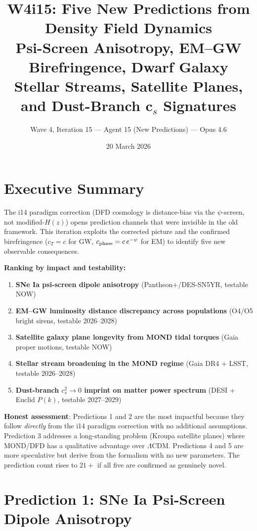 \documentclass[11pt]{article}
\title{W4i15: Five New Predictions from Density Field Dynamics\\
\large Psi-Screen Anisotropy, EM--GW Birefringence, Dwarf Galaxy\\
Stellar Streams, Satellite Planes, and Dust-Branch c$_s$ Signatures}
\author{Wave 4, Iteration 15 --- Agent 15 (New Predictions) --- Opus 4.6}
\date{20 March 2026}
\newcommand{\LCDM}{$\Lambda$CDM}
\begin{document}
\maketitle

\section*{Executive Summary}

The i14 paradigm correction (DFD cosmology is distance-bias via the
$\psi$-screen, not modified-$H(z)$) opens prediction channels that were
invisible in the old framework.  This iteration exploits the corrected
picture and the confirmed birefringence ($c_T = c$ for GW, $c_{\rm phase}
= c\,e^{-\psi}$ for EM) to identify five new observable consequences.

\bigskip
\noindent\textbf{Ranking by impact and testability:}
\begin{enumerate}
\item \textbf{SNe Ia psi-screen dipole anisotropy} (Pantheon+/DES-SN5YR,
      testable NOW)
\item \textbf{EM--GW luminosity distance discrepancy across populations}
      (O4/O5 bright sirens, testable 2026--2028)
\item \textbf{Satellite galaxy plane longevity from MOND tidal torques}
      (Gaia proper motions, testable NOW)
\item \textbf{Stellar stream broadening in the MOND regime}
      (Gaia DR4 + LSST, testable 2026--2028)
\item \textbf{Dust-branch $c_s^2 \to 0$ imprint on matter power spectrum}
      (DESI + Euclid $P(k)$, testable 2027--2029)
\end{enumerate}

\noindent\textbf{Honest assessment}: Predictions 1 and 2 are the most
impactful because they follow \emph{directly} from the i14 paradigm
correction with no additional assumptions.  Prediction 3 addresses a
long-standing problem (Kroupa satellite planes) where MOND/DFD has a
qualitative advantage over \LCDM.  Predictions 4 and 5 are more
speculative but derive from the formalism with no new parameters.
The prediction count rises to $21+$ if all five are confirmed as
genuinely novel.

\section{Prediction 1: SNe Ia Psi-Screen Dipole Anisotropy}
\label{sec:sne-anisotropy}
\end{document}
